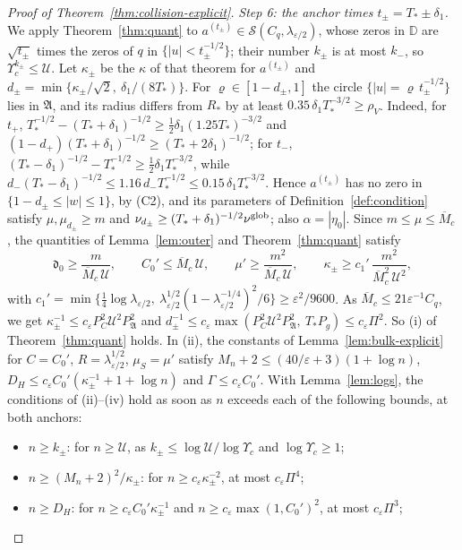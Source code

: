\documentclass[11pt]{amsart}
\theoremstyle{definition}
\theoremstyle{remark}
\numberwithin{equation}{section}
\newcommand{\D}{\mathbb{D}}
\newcommand{\eps}{\varepsilon}
\begin{document}
\begin{proof}[Proof of Theorem~\ref{thm:collision-explicit}]
\emph{Step 6: the anchor times $t_\pm=T_*\pm\delta_1$.} We apply Theorem~\ref{thm:quant} to $a^{(t_\pm)}\in\mathcal S(C_q,\lambda_{\eps/2})$, whose zeros in $\D$ are $\sqrt{t_\pm}$ times the zeros of $q$ in $\{|u|<t_\pm^{-1/2}\}$; their number $k_\pm$ is at most $k_-$, so $\Upsilon_c^{k_\pm}\le\mathcal U$. Let $\kappa_\pm$ be the $\kappa$ of that theorem for $a^{(t_\pm)}$ and $d_\pm=\min\{\kappa_\pm/\sqrt2,\ \delta_1/(8T_*)\}$. For $\varrho\in[1-d_\pm,1]$ the circle $\{|u|=\varrho\,t_\pm^{-1/2}\}$ lies in $\mathfrak A$, and its radius differs from $R_*$ by at least $0.35\,\delta_1T_*^{-3/2}\ge\rho_V$. Indeed, for $t_+$, $T_*^{-1/2}-(T_*+\delta_1)^{-1/2}\ge\frac12\delta_1(1.25T_*)^{-3/2}$ and $(1-d_+)(T_*+\delta_1)^{-1/2}\ge(T_*+2\delta_1)^{-1/2}$; for $t_-$, $(T_*-\delta_1)^{-1/2}-T_*^{-1/2}\ge\frac12\delta_1T_*^{-3/2}$, while $d_-(T_*-\delta_1)^{-1/2}\le1.16\,d_-T_*^{-1/2}\le0.15\,\delta_1T_*^{-3/2}$. Hence $a^{(t_\pm)}$ has no zero in $\{1-d_\pm\le|w|\le1\}$, by (C2), and its parameters of Definition~\ref{def:condition} satisfy $\mu,\mu_{d_\pm}\ge m$ and $\nu_{d_\pm}\ge(T_*+\delta_1)^{-1/2}\nu^{\rm glob}$; also $\alpha=|\eta_0|$. Since $m\le\mu\le\overline M_c$, the quantities of Lemma~\ref{lem:outer} and Theorem~\ref{thm:quant} satisfy
\[
\mathfrak d_0\ge\frac m{\overline M_c\,\mathcal U},\qquad C_0'\le\overline M_c\,\mathcal U,\qquad\mu'\ge\frac{m^2}{\overline M_c\,\mathcal U},\qquad\kappa_\pm\ge c_1'\,\frac{m^2}{\overline M_c^2\,\mathcal U^2},
\]
with $c_1'=\min\{\frac14\log\lambda_{\eps/2},\ \lambda_{\eps/2}^{1/2}(1-\lambda_{\eps/2}^{-1/4})^2/6\}\ge\eps^2/9600$. As $\overline M_c\le21\eps^{-1}C_q$, we get $\kappa_\pm^{-1}\le c_\eps P_C^2\mathcal U^2P_{\mathfrak A}^2$ and $d_\pm^{-1}\le c_\eps\max(P_C^2\mathcal U^2P_{\mathfrak A}^2,\ T_*P_g)\le c_\eps\Pi^2$. So (i) of Theorem~\ref{thm:quant} holds. In (ii), the constants of Lemma~\ref{lem:bulk-explicit} for $C=C_0'$, $R=\lambda_{\eps/2}^{1/2}$, $\mu_S=\mu'$ satisfy $M_n+2\le(40/\eps+3)(1+\log n)$, $D_H\le c_\eps C_0'(\kappa_\pm^{-1}+1+\log n)$ and $\Gamma\le c_\eps C_0'$. With Lemma~\ref{lem:logs}, the conditions of (ii)--(iv) hold as soon as $n$ exceeds each of the following bounds, at both anchors:
\begin{itemize}
\item $n\ge k_\pm$: for $n\ge\mathcal U$, as $k_\pm\le\log\mathcal U/\log\Upsilon_c$ and $\log\Upsilon_c\ge1$;
\item $n\ge(M_n+2)^2/\kappa_\pm$: for $n\ge c_\eps\kappa_\pm^{-2}$, at most $c_\eps\Pi^4$;
\item $n\ge D_H$: for $n\ge c_\eps C_0'\kappa_\pm^{-1}$ and $n\ge c_\eps\max(1,C_0')^2$, at most $c_\eps\Pi^3$;

\end{itemize}
\end{proof}
\end{document}
